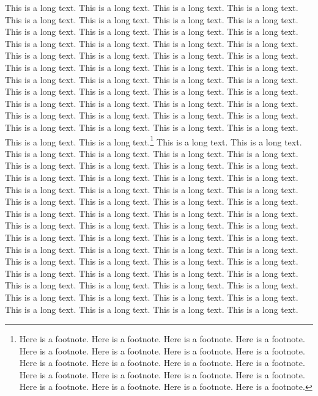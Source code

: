 \documentclass[twoside]{article}
\begin{document}
This is a long text. This is a long text.
This is a long text. This is a long text.
This is a long text. This is a long text.
This is a long text. This is a long text.
This is a long text. This is a long text.
This is a long text. This is a long text.
This is a long text. This is a long text.
This is a long text. This is a long text.
This is a long text. This is a long text.
This is a long text. This is a long text.
This is a long text. This is a long text.
This is a long text. This is a long text.
This is a long text. This is a long text.
This is a long text. This is a long text.
This is a long text. This is a long text.
This is a long text. This is a long text.
This is a long text. This is a long text.
This is a long text. This is a long text.
This is a long text. This is a long text.
This is a long text. This is a long text.
This is a long text. This is a long text.
This is a long text. This is a long text.
This is a long text. This is a long text.\footnote{%
  Here is a footnote. Here is a footnote.
  Here is a footnote. Here is a footnote.
  Here is a footnote. Here is a footnote.
  Here is a footnote. Here is a footnote.
  Here is a footnote. Here is a footnote.
  Here is a footnote. Here is a footnote.
  Here is a footnote. Here is a footnote.
  Here is a footnote. Here is a footnote.
  Here is a footnote. Here is a footnote.
  Here is a footnote. Here is a footnote.}
This is a long text. This is a long text.
This is a long text. This is a long text.
This is a long text. This is a long text.
This is a long text. This is a long text.
This is a long text. This is a long text.
This is a long text. This is a long text.
This is a long text. This is a long text.
This is a long text. This is a long text.
This is a long text. This is a long text.
This is a long text. This is a long text.
This is a long text. This is a long text.
This is a long text. This is a long text.
This is a long text. This is a long text.
This is a long text. This is a long text.
This is a long text. This is a long text.
This is a long text. This is a long text.
This is a long text. This is a long text.
This is a long text. This is a long text.
This is a long text. This is a long text.
This is a long text. This is a long text.
This is a long text. This is a long text.
This is a long text. This is a long text.
This is a long text. This is a long text.
This is a long text. This is a long text.
This is a long text. This is a long text.
This is a long text. This is a long text.
This is a long text. This is a long text.
This is a long text. This is a long text.
This is a long text. This is a long text.
\end{document}
